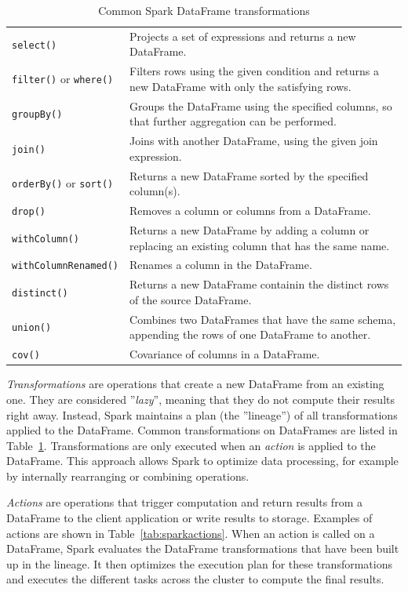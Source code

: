 \begin{advanced}
\begin{table}
\begin{tabularx}{\textwidth}{l|X} \hline
\texttt{select()} & Projects a set of expressions and returns a new DataFrame. \\
\texttt{filter()} or \texttt{where()} & Filters rows using the given condition and returns a new DataFrame with only the satisfying rows. \\
\texttt{groupBy()} & Groups the DataFrame using the specified columns, so that further aggregation can be performed. \\
\texttt{join()} & Joins with another DataFrame, using the given join expression. \\
\texttt{orderBy()} or \texttt{sort()} & Returns a new DataFrame sorted by the specified column(s).\\
\texttt{drop()} & Removes a column or columns from a DataFrame.\\
\texttt{withColumn()} & Returns a new DataFrame by adding a column or replacing an existing column that has the same name.\\
\texttt{withColumnRenamed()} & Renames a column in the DataFrame. \\
\texttt{distinct()} & Returns a new DataFrame containin the distinct rows of the source DataFrame.\\
\texttt{union()} & Combines two DataFrames that have the same schema, appending the rows of one DataFrame to another.\\
\texttt{cov()} & Covariance of columns in a DataFrame.\\ \hline
\end{tabularx}
\caption{Common Spark DataFrame transformations}
\label{tab:sparktransformations}
\end{table}


\emph{Transformations} are operations that create a new DataFrame from an existing one. They are considered ''\emph{lazy}'', meaning that they do not compute their results right away. Instead, Spark maintains a plan (the ''lineage'') of all transformations applied to the DataFrame. Common transformations on DataFrames are listed in Table~\ref{tab:sparktransformations}. Transformations are only executed when an \emph{action} is applied to the DataFrame. This approach allows Spark to optimize data processing, for example by internally rearranging or combining operations.

\emph{Actions} are operations that trigger computation and return results from a DataFrame to the client application or write results to storage. Examples of actions are shown in Table~\ref{tab:sparkactions}. When an action is called on a DataFrame, Spark evaluates the DataFrame transformations that have been built up in the lineage. It then optimizes the execution plan for these transformations and executes the different tasks across the cluster to compute the final results.


\end{advanced}
